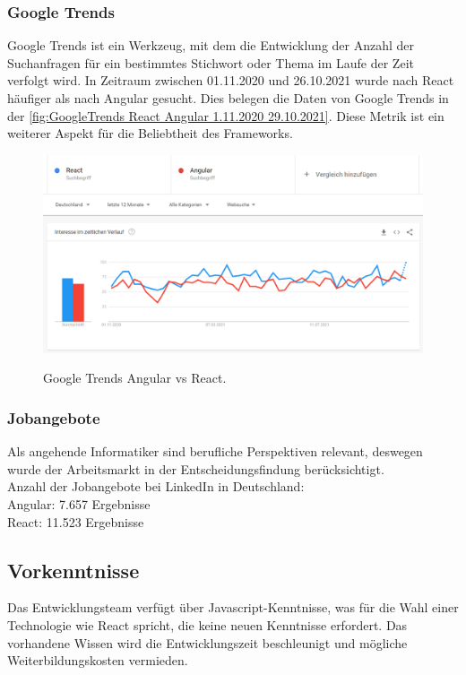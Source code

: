 \subsubsection*{Google Trends}
Google Trends ist ein Werkzeug, mit dem die Entwicklung der Anzahl der Suchanfragen für ein bestimmtes Stichwort oder Thema im Laufe der Zeit verfolgt wird\cite{GO02}. In Zeitraum zwischen 01.11.2020 und 26.10.2021 wurde nach React häufiger als nach Angular gesucht. Dies belegen die Daten von Google Trends in der \autoref{fig:GoogleTrends React Angular 1.11.2020 29.10.2021}. Diese Metrik ist ein weiterer Aspekt für die Beliebtheit des Frameworks.

\begin{figure}[h!]
  \centering
  \includegraphics[scale=0.5]{sources/GoogleTrends React Angular 1.11.2020 29.10.2021}
  \caption[Google Trends Angular vs React]{}
  \label{fig:GoogleTrends React Angular 1.11.2020 29.10.2021} 
  Google Trends Angular vs React{\cite{GO01}}.
\end{figure}

\subsubsection*{Jobangebote}
Als angehende Informatiker sind berufliche Perspektiven relevant, deswegen wurde der Arbeitsmarkt in der Entscheidungsfindung berücksichtigt.
\\
Anzahl der Jobangebote bei LinkedIn in Deutschland:\\
Angular: 7.657 Ergebnisse{\cite{LI1}}\\
React: 11.523 Ergebnisse{\cite{LI2}}

\subsection{Vorkenntnisse}
Das Entwicklungsteam verfügt über Javascript-Kenntnisse, was für die Wahl einer Technologie wie React spricht, die keine neuen Kenntnisse erfordert. Das vorhandene Wissen wird die Entwicklungszeit beschleunigt und mögliche Weiterbildungskosten vermieden.

